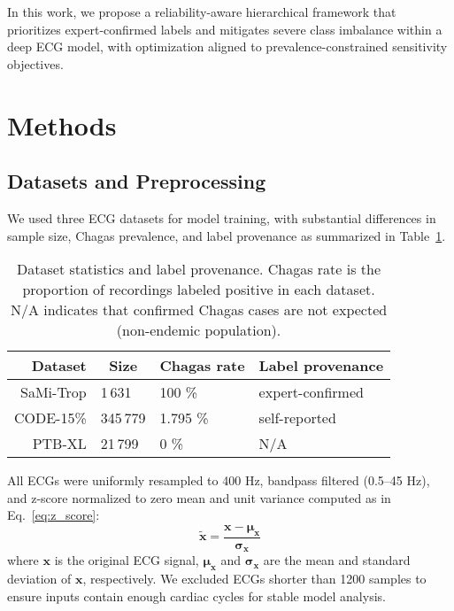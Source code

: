 \documentclass[twocolumn]{cinc}
\begin{document}
In this work, we propose a reliability-aware hierarchical framework that prioritizes expert-confirmed labels and mitigates severe class imbalance within a deep ECG model, with optimization aligned to prevalence-constrained sensitivity objectives.


\section{Methods}
\label{sec:methods}


\subsection{Datasets and Preprocessing}
\label{subsec:data}


We used three ECG datasets for model training, with substantial differences in sample size, Chagas prevalence, and label provenance as summarized in Table~\ref{tab:dataset_stats}.

\setlength{\tabcolsep}{4pt} %
\begin{table}[!htp]
\centering
\begin{tabular}{rlll}
\toprule
Dataset & \multicolumn{1}{c}{Size} & \multicolumn{1}{c}{Chagas rate} & Label provenance \\
\midrule
SaMi-Trop   & 1\,631     & 100 \%    & expert-confirmed \\
CODE-15\%   & 345\,779   & 1.795 \%  & self-reported \\
PTB-XL      & 21\,799    & 0 \%      & N/A \\
\bottomrule
\end{tabular}

\caption{Dataset statistics and label provenance. Chagas rate is the proportion of recordings labeled positive in each dataset. N/A indicates that confirmed Chagas cases are not expected (non-endemic population).}
\label{tab:dataset_stats}
\end{table}
\setlength{\tabcolsep}{6pt} %

All ECGs were uniformly resampled to 400 Hz, bandpass filtered (0.5–45 Hz), and z-score normalized to zero mean and unit variance computed as in Eq.~\ref{eq:z_score}:
\begin{equation}
\label{eq:z_score}
\tilde{\mathbf{x}} = \frac{\mathbf{x} - \boldsymbol{\mu}_{\mathbf{x}}}{\boldsymbol{\sigma}_{\mathbf{x}}}
\end{equation}
where $\mathbf{x}$ is the original ECG signal, $\boldsymbol{\mu}_{\mathbf{x}}$ and $\boldsymbol{\sigma}_{\mathbf{x}}$ are the mean and standard deviation of $\mathbf{x}$, respectively. We excluded ECGs shorter than 1200 samples to ensure inputs contain enough cardiac cycles for stable model analysis.
\end{document}
